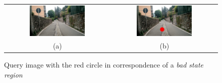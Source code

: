 \begin{figure}[t]
\centering
\begin{tabular}{cc}
\includegraphics[width=0.55\textwidth]{./img/ch-further/1461225656475_MEP_IMAGE}&
\includegraphics[width=0.55\textwidth]{./img/ch-further/1461225656475_MEP_IMAGE_with_mark}\\
(a)&(b)\\
\end{tabular}
\caption{Query image with the red circle in correspondence of a \emph{bad state region}}
\label{fig:mep_localize}
\end{figure}

